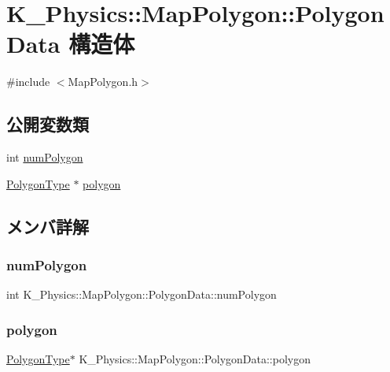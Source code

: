 \hypertarget{struct_k___physics_1_1_map_polygon_1_1_polygon_data}{}\section{K\+\_\+\+Physics\+:\+:Map\+Polygon\+:\+:Polygon\+Data 構造体}
\label{struct_k___physics_1_1_map_polygon_1_1_polygon_data}


{\ttfamily \#include $<$Map\+Polygon.\+h$>$}

\subsection*{公開変数類}
\begin{DoxyCompactItemize}
\item 
int \mbox{\hyperlink{struct_k___physics_1_1_map_polygon_1_1_polygon_data_a20746ae9989f097ffa21c9a0be396050}{num\+Polygon}}
\item 
\mbox{\hyperlink{struct_k___physics_1_1_map_polygon_1_1_polygon_type}{Polygon\+Type}} $\ast$ \mbox{\hyperlink{struct_k___physics_1_1_map_polygon_1_1_polygon_data_a510e830758a360dd1e0fd25c17f3b972}{polygon}}
\end{DoxyCompactItemize}


\subsection{メンバ詳解}
\mbox{\label{struct_k___physics_1_1_map_polygon_1_1_polygon_data_a20746ae9989f097ffa21c9a0be396050}} 
\subsubsection{\texorpdfstring{num\+Polygon}{numPolygon}}
{\footnotesize\ttfamily int K\+\_\+\+Physics\+::\+Map\+Polygon\+::\+Polygon\+Data\+::num\+Polygon}

\mbox{\label{struct_k___physics_1_1_map_polygon_1_1_polygon_data_a510e830758a360dd1e0fd25c17f3b972}} 
\subsubsection{\texorpdfstring{polygon}{polygon}}
{\footnotesize\ttfamily \mbox{\hyperlink{struct_k___physics_1_1_map_polygon_1_1_polygon_type}{Polygon\+Type}}$\ast$ K\+\_\+\+Physics\+::\+Map\+Polygon\+::\+Polygon\+Data\+::polygon}

